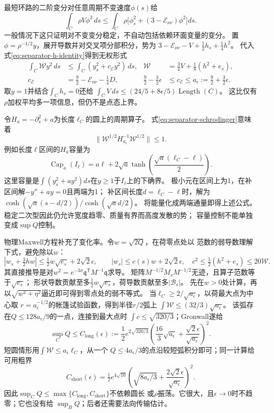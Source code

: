 \documentclass[UTF8,a4paper,11pt,fontset=fandol]{ctexart}
\numberwithin{equation}{section}
\theoremstyle{definition}
\begin{document}
最短环路的二阶变分对任意周期不变速度$\phi(s)$给
\begin{equation}\label{eq:separator-jacobi}
 \int_C\rho V\phi^2\,ds\le
 \int_C\rho\bigl[\phi_s^2+(3-\mathcal E_{\nu\nu})\phi^2\bigr]ds.
\end{equation}
一般情况下这只证明对不变变分稳定，不自动包括依赖环面变量的变分。
置$\phi=\rho^{-1/2}y$，展开导数并对交叉项分部积分，势为
$3-\mathcal E_{\nu\nu}-V+\frac12h_s+\frac14h^2$。
代入式\eqref{eq:separator-h-identity}得到无权形式
\begin{align}
 \int_C\mathcal W y^2\,ds
 &\le\int_C(y_s^2+c_{\mathcal E}y^2)\,ds,
 &\mathcal W&=\tfrac34V+\tfrac18(h^2+e_s),\label{eq:separator-schrodinger}\\
 c_{\mathcal E}&=\tfrac92-\mathcal E_{\nu\nu}-\tfrac14D,
 &\tfrac92-\tfrac32\epsilon&\le c_{\mathcal E}\le a_\epsilon:=\tfrac92+\tfrac32\epsilon.
\end{align}
取$y=1$并结合$\int_C h_s=0$还给
$\int_CV\,ds\le(24/5+8\epsilon/5)\operatorname{Length}(C)$。
这比仅有$\rho$加权平均多一项信息，但仍不是点态上界。

令$H_a=-\partial_s^2+a$为长度$\ell_C$的圆上的周期算子。
式\eqref{eq:separator-schrodinger}意味着
\[
 \|\mathcal W^{1/2}H_{a_\epsilon}^{-1}\mathcal W^{1/2}\|\le1.
\]
例如长度$\ell$区间的$H_a$容量为
\[
 \operatorname{Cap}_a(I_\ell)
 =a\ell+2\sqrt a\tanh\!\left(\frac{\sqrt a(\ell_C-\ell)}2\right).
\]
这里容量是$\int(y_s^2+ay^2)ds$在$y\ge1$于$I_\ell$上的下确界。
极小元在区间上为1，在补区间解$-y''+ay=0$且两端为1；
补区间长度$d=\ell_C-\ell$时，解为
$\cosh(\sqrt a(s-d/2))/\cosh(\sqrt a d/2)$。
将能量化成两端通量即得上述公式。
稳定二次型因此仍允许宽度趋零、质量有界而高度发散的势；
容量控制不能单独变成$\sup Q$控制。

物理Maxwell方程补充了变化率。令$w=\sqrt{2Q}$，在荷零点处以
范数的弱导数理解下式，避免除以$w$：
\[
 |w_s+\tfrac32hw|\le\tfrac12w\sqrt{e_s}+2\sqrt2\epsilon,
 \qquad
 |w_s|\le c(s)w+2\sqrt2\epsilon,
 \quad c^2\le\tfrac52(h^2+e_s)\le20\mathcal W.
\]
其直接推导是对$w^2=e^{-3\sigma}\mathfrak q^{\mathsf T}M^{-1}\mathfrak q$求导。
矩阵$M^{-1/2}M_sM^{-1/2}$无迹，且算子范数等于$\sqrt{e_s}$；
形状导数贡献至多$\frac12w\sqrt{e_s}$，荷导数贡献至多$|\mathscr B_s|$。
先在$w>0$处计算，再以$\sqrt{w^2+\eta^2}$逼近即可得到零点处的弱不等式。
当$\ell_C\ge2/\sqrt{a_\epsilon}$，以荷最大点为中心取
$r=a_\epsilon^{-1/2}$的帐篷试验函数，得到半径$r/2$弧上
$\int\mathcal W\le(32/3)\sqrt{a_\epsilon}$。
该弧存在$Q\le128a_\epsilon/9$的一点，连接到最大点时
$\int c\le\sqrt{320/3}$；Gronwall遂给
\begin{equation}\label{eq:separator-Q-bound}
 \sup_CQ\le C_{\mathrm{long}}(\epsilon):=
 \frac12e^{2\sqrt{320/3}}
 \left(\frac{16}{3}\sqrt{a_\epsilon}
       +\frac{\sqrt2\epsilon}{\sqrt{a_\epsilon}}\right)^2.
\end{equation}
短圆情形用$\int\mathcal W\le a_\epsilon\ell_C$，从一个
$Q\le4a_\epsilon/3$的点沿较短弧积分即可；同一计算给可用粗界
\[
 C_{\mathrm{short}}(\epsilon)=\tfrac12e^{4\sqrt{10}}
 \left(\sqrt{8a_\epsilon/3}
       +\frac{2\sqrt2\epsilon}{\sqrt{a_\epsilon}}\right)^2.
\]
因此$\sup_CQ\le\max\{C_{\mathrm{long}},C_{\mathrm{short}}\}$不依赖圆长
或$\rho$振荡。它很大，且$\epsilon\to0$时不趋零；它也没有给
$\sup_BQ$；后者还需要法向传输估计。
\end{document}
